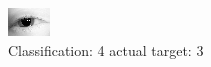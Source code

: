 \begin{figure}[h!]
\begin{center}
\includegraphics[width=0.60\columnwidth]{figures/ID55_class_4_target_3.png}
\end{center}
\caption{ Classification: 4 actual target: 3}
\label{fig:ID55_class_4_target_3}
\end{figure}
